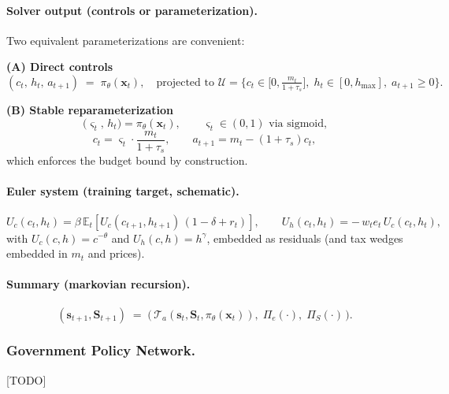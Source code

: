 \documentclass[11pt]{article}
\begin{document}
\paragraph{Solver output (controls or parameterization).}
Two equivalent parameterizations are convenient:

\medskip
\noindent\textbf{(A) Direct controls}
\[
(c_t,\,h_t,\,a_{t+1}) \;=\; \pi_\theta(\mathbf{x}_t),
\quad \text{projected to } \mathcal{U}=\Big\{ c_t\!\in\!\big[0,\tfrac{m_t}{1+\tau_s}\big],\; h_t\!\in\![0,h_{\max}],\; a_{t+1}\!\ge\!0 \Big\}.
\]

\noindent\textbf{(B) Stable reparameterization}
\[
\big(\varsigma_t,\,h_t\big) = \pi_\theta(\mathbf{x}_t),
\qquad \varsigma_t \in (0,1) \text{ via sigmoid,}
\]
\[
c_t = \varsigma_t\cdot \frac{m_t}{1+\tau_s},\qquad
a_{t+1} = m_t - (1+\tau_s)c_t,
\]
which enforces the budget bound by construction.

\paragraph{Euler system (training target, schematic).}
\[
U_c(c_t,h_t) = \beta\,\mathbb{E}_t\!\left[ U_c(c_{t+1},h_{t+1})\,(1-\delta + r_t)\right],
\qquad
U_h(c_t,h_t) = -\,w_t e_t \, U_c(c_t,h_t),
\]
with $U_c(c,h)=c^{-\theta}$ and $U_h(c,h)=h^{\gamma}$, embedded as residuals (and tax wedges embedded in $m_t$ and prices).

\paragraph{Summary (markovian recursion).}
\[
(\mathbf{s}_{t+1},\mathbf{S}_{t+1})
\;=\;
\Big(\,\mathcal{T}_a(\mathbf{s}_t,\mathbf{S}_t,\pi_\theta(\mathbf{x}_t)),\;\Pi_e(\cdot),\;\Pi_S(\cdot)\,\Big).
\]

\subsubsection{Government Policy Network.}
[TODO]

\pagebreak

\printbibliography[title={REFERENCES }, heading=bibintoc]
\end{document}
